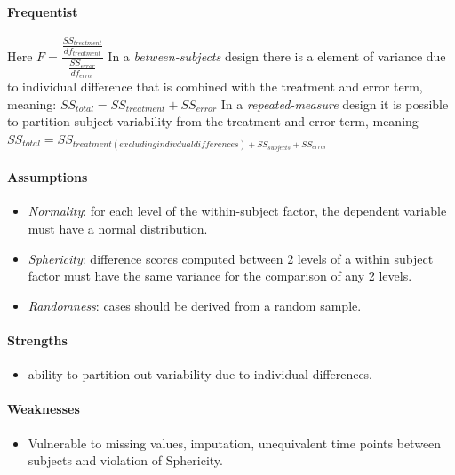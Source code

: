 \paragraph{Frequentist}
Here $F = \dfrac{\frac{SS_{treatment}}{df_{treatment}}}{\frac{SS_{error}}{df_{error}}}$
In a \emph{between-subjects} design there is a element of variance due to individual difference that 
is combined with the treatment and error term, meaning: $SS_{total} = SS_{treatment} + SS_{error}$
In a \emph{repeated-measure} design it is possible to partition subject variability from the
treatment and error term, meaning $SS_{total} = SS_{treatment(excluding indivdual differences) + SS_{subjects} + SS_{error}}$

\paragraph{Assumptions}
\begin{itemize}
    \item \emph{Normality}: for each level of the within-subject factor, the dependent variable must have a normal distribution.
    \item \emph{Sphericity}: difference scores computed between 2 levels of a within subject factor must have the same variance
    for the comparison of any 2 levels.
    \item \emph{Randomness}: cases should be derived from a random sample.
\end{itemize}
\paragraph{Strengths}
\begin{itemize}
    \item ability to partition out variability due to individual differences.
\end{itemize}
\paragraph{Weaknesses}
\begin{itemize}
    \item Vulnerable to missing values, imputation, unequivalent time points
    between subjects and violation of Sphericity.
\end{itemize}

